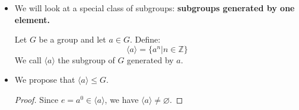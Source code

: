 \begin{itemize}
    \item We will look at a special class of subgroups: \textbf{subgroups generated by one element.}
    \begin{definition}
        Let $G$ be a group and let $a \in G$. Define:
        \begin{equation}
            \langle a \rangle = \{a^n | n\in \mathbb{Z}\}
        \end{equation}
        We call $\langle a \rangle$ the subgroup of $G$ generated by $a$.
    \end{definition}
    \item We propose that $\langle a \rangle \le G$.
    \begin{proof}
        Since $e=a^0 \in \langle a \rangle$, we have $\langle a \rangle \neq \varnothing$.
        

\end{proof}
\end{itemize}

